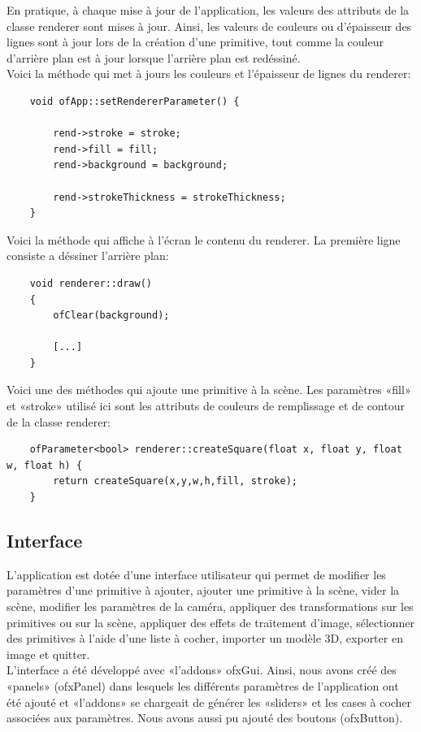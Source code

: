 En pratique, à chaque mise à jour de l'application, les valeurs des attributs de la classe renderer sont mises à jour. Ainsi, les valeurs de couleurs ou d'épaisseur des lignes sont à jour lors de la création d'une primitive, tout comme la couleur d'arrière plan est à jour lorsque l'arrière plan est redéssiné. \\ 

Voici la méthode qui met à jours les couleurs et l'épaisseur de lignes du renderer:
\begin{lstlisting}
	void ofApp::setRendererParameter() {
		
		rend->stroke = stroke;
		rend->fill = fill;
		rend->background = background;
		
		rend->strokeThickness = strokeThickness;
	}
\end{lstlisting}

Voici la méthode qui affiche à l'écran le contenu du renderer. La première ligne consiste a déssiner l'arrière plan:
\begin{lstlisting}
	void renderer::draw()
	{
		ofClear(background);
		
		[...]
	}
\end{lstlisting}

Voici une des méthodes qui ajoute une primitive à la scène. Les paramètres «fill» et «stroke» utilisé ici sont les attributs de couleurs de remplissage et de contour de la classe renderer:
\begin{lstlisting}
	ofParameter<bool> renderer::createSquare(float x, float y, float w, float h) {
		return createSquare(x,y,w,h,fill, stroke);
	}
\end{lstlisting}

\subsection{Interface}
L'application est dotée d'une interface utilisateur qui permet de modifier les paramètres d'une primitive à ajouter, ajouter une primitive à la scène, vider la scène, modifier les paramètres de la caméra, appliquer des transformations sur les primitives ou sur la scène, appliquer des effets de traitement d'image, sélectionner des primitives à l'aide d'une liste à cocher, importer un modèle 3D, exporter en image et quitter. \\

L'interface a été développé avec «l'addons» ofxGui. Ainsi, nous avons créé des «panels» (ofxPanel) dans lesquels les différents paramètres de l'application ont été ajouté et «l'addons» se chargeait de générer les «sliders» et les cases à cocher associées aux paramètres. Nous avons aussi pu ajouté des boutons (ofxButton).\\

